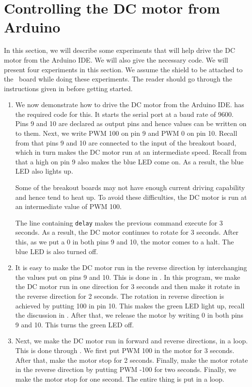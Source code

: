\section{Controlling the DC motor from Arduino}
\label{sec:dcm-ard}
In this section, we will describe some experiments that will help
drive the DC motor from the Arduino IDE.  We will also give the
necessary code.  We will present four experiments in this section.  We
assume the shield to be attached to the \arduino\ board while doing
these experiments.  The reader should go through the instructions
given in  before getting started.
\begin{enumerate}
\item We now demonstrate how to drive the DC motor from the Arduino
  IDE.   has the required code for this.  It
  starts the serial port at a baud rate of 9600.  Pins 9 and 10 are
  declared as output pins and hence values can be written on to them.
  Next, we write PWM 100 on pin 9 and PWM 0 on pin 10.  Recall from
   that pins 9 and 10 are connected to the
  input of the breakout board, which in turn makes the DC motor run at
  an intermediate speed.  Recall from  that a
  high on pin 9 also makes the blue LED come on.  As a result, the
  blue LED also lights up.

  Some of the breakout boards may not have enough current driving
  capability and hence tend to heat up.  To avoid these difficulties,
  the DC motor is run at an intermediate value of PWM 100.

  The line containing {\tt delay} makes the previous command execute
  for 3 seconds.  As a result, the DC motor continues to rotate for 3
  seconds.  After this, as we put a 0 in both pins 9 and 10, the motor
  comes to a halt.  The blue LED is also turned off.

\item It is easy to make the DC motor run in the reverse direction by
  interchanging the values put on pins 9 and 10.  This is done in
  .  In this program, we make the DC motor
  run in one direction for 3 seconds and then make it rotate in the
  reverse direction for 2 seconds.  The rotation in reverse direction
  is achieved by putting 100 in pin 10.  This makes the green LED
  light up, recall the discussion in .  After
  that, we release the motor by writing 0 in both pins 9 and 10.  This
  turns the green LED off.

\item Next, we make the DC motor run in forward and reverse
  directions, in a loop.  This is done through
  .  We first put PWM 100 in the motor for 3
  seconds.  After that, make the motor stop for 2 seconds.  Finally,
  make the motor rotate in the reverse direction by putting PWM -100
  for two seconds.  Finally, we make the motor stop for one second.
  The entire thing is put in a loop.
\end{enumerate}

